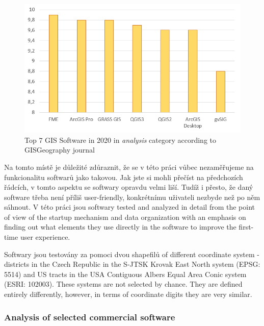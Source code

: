 \documentclass[a4paper,10pt,twoside]{article}
\begin{document}
\begin{figure}[hbt!] 
\begin{center}
\includegraphics[width=12cm]{../pictures/hodnoceni_analysis.png} 
\caption[Top 7 GIS Software in 2020 in \textit{analysis} category according to GISGeography journal]{Top 7 GIS Software in 2020 in \textit{analysis} category according to GISGeography journal}
\label{fig:hodnoceni_analysis}
\end{center}
\end{figure}

\noindent Na tomto místě je důležité zdůraznit, že se v této práci vůbec nezaměřujeme na funkcionalitu softwarů jako takovou. Jak jste si mohli přečíst na předchozích řádcích, v tomto aspektu se softwary opravdu velmi liší. Tudíž i přesto, že daný software třeba není příliš user-friendly, konkrétnímu uživateli nezbyde než po něm sáhnout. V této práci jsou  softwary tested and analyzed in detail from the point of view of the startup mechanism and data organization with an emphasis on finding out what elements they use directly in the software to improve the first-time user experience.

Softwary jsou testovány za pomoci dvou shapefilů of different coordinate system - districts in the Czech Republic in the S-JTSK Krovak East North system (EPSG: 5514) and US tracts in the USA Contiguous Albers Equal Area Conic system  (ESRI: 102003). These systems are not selected by chance. They are defined entirely differently, however, in terms of coordinate digits they are very similar.

\newpage
\vspace*{-1cm}
\subsubsection{Analysis of selected commercial software}
\end{document}
